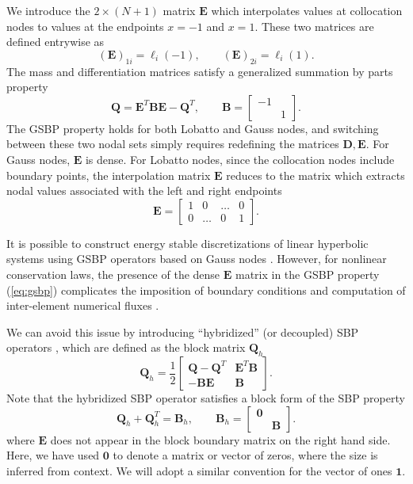 \documentclass{svjour3}                     %
\newcommand{\LRp}[1]{\left( #1 \right)}
\begin{document}
We introduce the $2\times (N+1)$ matrix $\bm{E}$ which interpolates values at collocation nodes to values at the endpoints $x = -1$ and $x=1$.  These two matrices are defined entrywise as
\[
\LRp{\bm{E}}_{1i} = \ell_i(-1), \qquad  \LRp{\bm{E}}_{2i} = \ell_i(1).
\]
The mass and differentiation matrices satisfy a generalized summation by parts property \cite{fernandez2014generalized}
\begin{equation}
\bm{Q} = \bm{E}^T \bm{B} \bm{E} - \bm{Q}^T, \qquad \bm{B} = \begin{bmatrix}-1 & \\ & 1\end{bmatrix}.
\label{eq:gsbp}
\end{equation}
The GSBP property holds for both Lobatto and Gauss nodes, and switching between these two nodal sets simply requires redefining the matrices $\bm{D}, \bm{E}$.  For Gauss nodes, $\bm{E}$ is dense.  For Lobatto nodes, since the collocation nodes include boundary points, the interpolation matrix $\bm{E}$ reduces to the matrix which extracts nodal values associated with the left and right endpoints
\[
\bm{E} = \begin{bmatrix}
1 & 0 & \ldots & 0\\
0 & \ldots & 0 & 1
\end{bmatrix}.
\]

It is possible to construct energy stable discretizations of linear hyperbolic systems using GSBP operators based on Gauss nodes \cite{fernandez2014generalized}.  However, for nonlinear conservation laws, the presence of the dense $\bm{E}$ matrix in the GSBP property (\ref{eq:gsbp}) complicates the imposition of boundary conditions and computation of inter-element numerical fluxes \cite{crean2018entropy, chan2017discretely, chan2018efficient}.  

We can avoid this issue by introducing ``hybridized'' (or decoupled) SBP operators \cite{chan2017discretely, chenreview}, which are defined as the block matrix $\bm{Q}_h$ \cite{chan2019skew}
\[
\bm{Q}_h = \frac{1}{2}\begin{bmatrix}
\bm{Q}-\bm{Q}^T & \bm{E}^T\bm{B}\\
-\bm{B}\bm{E} & \bm{B}
\end{bmatrix}.
\]
Note that the hybridized SBP operator satisfies a block form of the SBP property
\begin{equation}
\bm{Q}_h + \bm{Q}_h^T = \bm{B}_h, \qquad \bm{B}_h =  \begin{bmatrix}
\bm{0} & \\
& \bm{B}\end{bmatrix}.
\label{eq:hsbp}
\end{equation}
where $\bm{E}$ does not appear in the block boundary matrix on the right hand side.  Here, we have used $\bm{0}$ to denote a matrix or vector of zeros, where the size is inferred from context.  We will adopt a similar convention for the vector of ones $\bm{1}$.  
\end{document}
